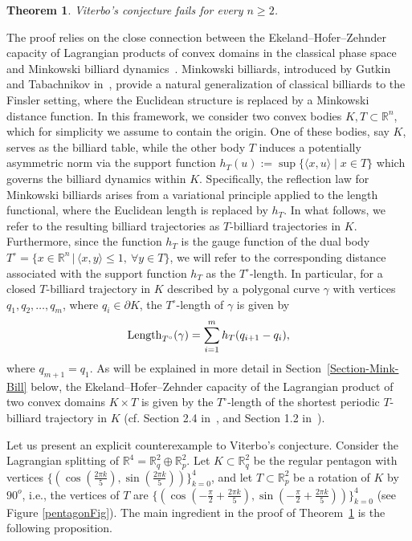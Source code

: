 \documentclass[10pt,a4paper]{article}
\newtheorem{theorem}{Theorem}[section]
\theoremstyle{definition}
\newcommand{\R}{{\mathbb{R}}}
\begin{document}
\begin{theorem}
\label{counterexample_thm}
Viterbo's conjecture fails 
for every 
$n \geq 2$.
\end{theorem}

The proof relies on the close connection between the Ekeland--Hofer--Zehnder capacity of Lagrangian products of convex domains in the classical phase space and Minkowski billiard dynamics~\cite{AA-O}. Minkowski billiards, introduced by Gutkin and Tabachnikov in~\cite{GutTab}, provide a natural generalization of classical billiards to the Finsler setting, where the Euclidean structure is replaced by a Minkowski distance function. In this framework, we consider two convex bodies \( K, T \subset \mathbb{R}^n \), which for simplicity we assume to contain the origin.
 One of these bodies, say \( K \), serves as the billiard table, while the other body \( T \) induces a potentially asymmetric norm via the support function  
$
h_T(u) := \sup \{ \langle x, u \rangle \mid x \in T\}
$
which governs the billiard dynamics within \( K \). Specifically, the reflection law for Minkowski billiards arises from a variational principle applied to the length functional, where the Euclidean length is replaced by \( h_T \). In what follows, we refer to the resulting billiard trajectories as \( T \)-billiard trajectories in \( K \).
Furthermore, since the function \( h_T \) is the gauge function of the dual body \( T^{\circ} = \{ x \in {\mathbb R}^{n} \, | \, \langle x,y \rangle \leq 1, \ \forall y \in T\} \), we will refer to the corresponding distance associated with the support function \( h_T \) as the \( T^{\circ} \)-length. 
In particular, for a  closed $T$-billiard trajectory in $K$ described by a  polygonal curve $\gamma$ with vertices $q_1,q_2,\ldots,q_m$, where $q_i \in \partial K$, the $T^\circ$-length of $\gamma$ is given by
$$ {\rm Length}_{T^{\circ}} (\gamma) = \sum_{i=1}^{m} h_T (q_{i+1}-q_i),$$
where $q_{m+1} = q_1$. As will be explained in more detail in Section~\ref{Section-Mink-Bill} below, the Ekeland--Hofer--Zehnder capacity of the Lagrangian product of two convex domains \( K \times T \) is given by the \( T^{\circ} \)-length of the shortest periodic \( T \)-billiard trajectory in \( K \) (cf. Section 2.4 in~\cite{AA-O}, and Section 1.2 in~\cite{Mink-Bill-Rudolf}).
\medskip

Let us present an explicit counterexample to Viterbo's conjecture.
Consider the Lagrangian splitting of $\R^4 = \R^2_q \oplus \R^2_p$. Let $K \subset \R^2_q$ be the regular pentagon with vertices $\{(\cos(\frac{2\pi k}{5}), \sin(\frac{2\pi k}{5}))\}_{k=0}^4$,
and let $T \subset \R^2_p$ be a rotation of $K$ by $90^o$, i.e., the vertices of $T$ are $\{(\cos(-\frac{\pi}{2} + \frac{2\pi k}{5}), \sin(-\frac{\pi}{2} + \frac{2\pi k}{5}))\}_{k=0}^4$ (see Figure \ref{pentagonFig}). The main ingredient in the proof of Theorem~\ref{counterexample_thm} is the following proposition.
\end{document}
